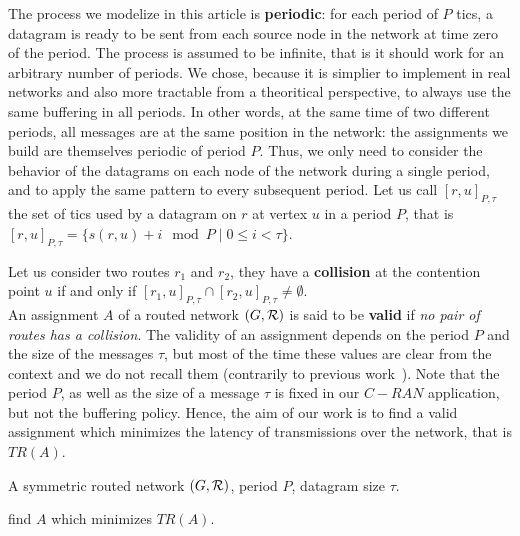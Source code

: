 \documentclass[english]{article}
\begin{document}
 	The process we modelize in this article is \textbf{periodic}: for each period of $P$ tics, a datagram is ready to be sent from each source node in the network at time zero of the period. The process is assumed to be infinite, that is it should work for an arbitrary number of periods. We chose, because it is simplier to implement in real networks and also more tractable from a theoritical perspective, to always use the same buffering in all periods. In other words, at the same time of two different periods, all messages are at the same position in the network: the assignments we build are themselves periodic of period $P$. Thus, we only need to consider the behavior of the datagrams on each node of the network during a single period, and to apply the same pattern to every subsequent period. 
    Let us call $[r,u]_{P,\tau}$ the set of tics used by a datagram on $r$ at vertex $u$ in a period $P$, that is $[r,u]_{P,\tau} = \{s(r,u) + i \mod P \mid 0 \leq i < \tau \}$. 

      Let us consider two routes $r_1$ and $r_2$, they have a {\bf collision} at the contention point $u$ if and only if $[r_1,u]_{P,\tau} \cap [r_2,u]_{P,\tau} \neq \emptyset$.\\

        An assignment $A$ of a routed network $(G,{\cal R})$ is said to be \textbf{valid} if \emph{no pair of routes has a collision}. 
        The validity of an assignment depends on the period $P$ and the size of the messages $\tau$, but most of the time these values are clear from the context and we do not recall them (contrarily to previous work~\cite{Guir1806:Deterministic}).
        Note that the period $P$, as well as the size of a message $\tau$ is fixed in our $C-RAN$ application, but not the buffering policy. Hence, the aim of our work is to find a valid assignment which minimizes the latency of transmissions over the network, that is $TR(A)$.
        
       

        A symmetric routed network $(G,{\cal R})$, period $P$, datagram size $\tau$.%
      

       find $A$ which minimizes $TR(A)$.
    
    
\end{document}

